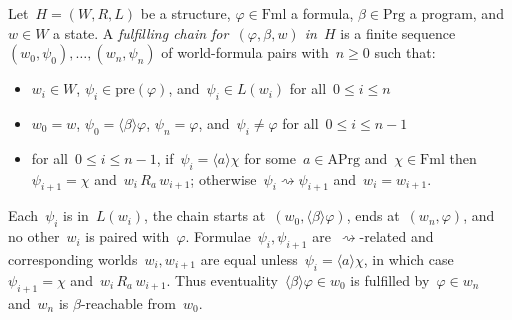 \documentclass{entcs}
\newcommand{\pea}[2]{\langle#1\rangle #2}
\newcommand{\fml}{\mathrm{Fml}}
\newcommand{\prg}{\mathrm{Prg}}
\newcommand{\act}{\mathrm{APrg}}
\newcommand{\prel}[3]{#1 \,#2\, #3}
\newcommand{\ppre}[1]{\mathrm{pre}(#1)}
\newcommand{\pzz}{\mathrel{\rightsquigarrow}}
\begin{document}
\begin{definition}
  Let~$H = (W,R,L)$ be a structure, $\varphi \in \fml$ a formula, $\beta \in \prg$ a program, and~$w \in W$ a state.
  A \emph{fulfilling chain for~$(\varphi, \beta, w)$ in~$H$}
  is a finite sequence~$(w_0, \psi_0), \dotsc, (w_n, \psi_n)$ of world-formula pairs with~$n \geq 0$ such that:
  \begin{itemize}
  \item $w_i \in W$, $\psi_i \in \ppre{\varphi}$, and~$\psi_i \in L(w_i)$ for all~$0 \leq i \leq n$
  \item $w_0 = w$, $\psi_0 = \pea{\beta}{\varphi}$, $\psi_n = \varphi$, and~$\psi_i \neq \varphi$ for all~$0 \leq i \leq n-1$
  \item for all~$0 \leq i \leq n-1$,
    if~$\psi_i = \pea{a}{\chi}$ for some~$a \in \act$ and~$\chi \in \fml$
    then~$\psi_{i+1} = \chi$ and~$\prel{w_i}{R_a}{w_{i+1}}$;
    otherwise~$\psi_i \pzz \psi_{i+1}$ and~$w_i = w_{i+1}$.
  \end{itemize}
\end{definition}
Each~$\psi_i$ is in~$L(w_i)$,
the chain starts at~$(w_0, \pea{\beta}{\varphi})$, ends at~$(w_n, \varphi)$,
and no other~$w_i$ is paired with~$\varphi$.
Formulae~$\psi_i, \psi_{i+1}$ are~$\pzz$-related 
and corresponding worlds~$w_i, w_{i+1}$ are equal
unless~$\psi_i = \pea{a}{\chi}$,
in which case~$\psi_{i+1} = \chi$ and~$\prel{w_i}{R_a}{w_{i+1}}$.
Thus eventuality~$\pea{\beta}{\varphi} \in w_0$ is fulfilled by~$\varphi \in w_n$
and~$w_n$ is $\beta$-reachable from~$w_0$.
\end{document}
